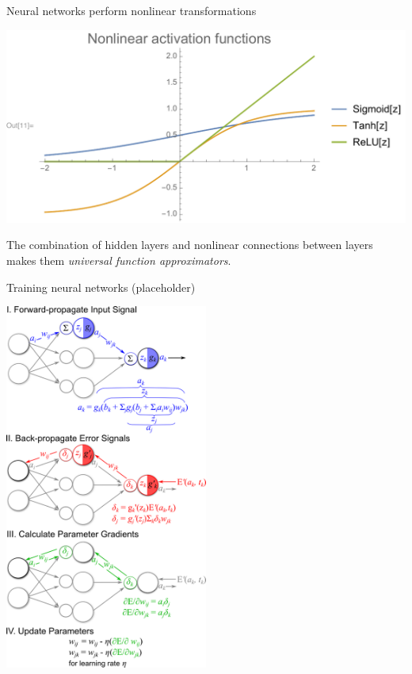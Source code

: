 \documentclass[xetex,compress]{beamer}
\begin{document}
\begin{frame}{Neural networks perform nonlinear transformations}
  \begin{center}
    \includegraphics[width=1.00\textwidth]{./figures/nonlinear_activation.pdf}
  \end{center}
  The combination of hidden layers and nonlinear connections between layers makes them \emph{universal function approximators}.
\end{frame}


\begin{frame}{Training neural networks (placeholder)}
  \begin{center}
    \includegraphics[width=0.50\textwidth]{./figures/fprop_bprop5.png}
  \end{center}
\end{frame}
\end{document}
